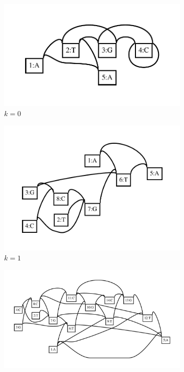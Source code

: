 \documentclass[a4paper,12pt,numbered,oneside]{Classes/PhDThesisPSnPDF}
\begin{document}
\begin{figure}[htbp!] 
  \centering
  \begin{subfigure}[t]{0.49\textwidth}
    \includegraphics[width=1.0\textwidth]{Chapter2/Figs/loopy_dagify0.pdf}
    \caption{$k=0$} \label{subfig:dagify_k0}
  \end{subfigure}
  \begin{subfigure}[t]{0.49\textwidth}
    \includegraphics[width=1.0\textwidth]{Chapter2/Figs/loopy_dagify1.pdf}
    \caption{$k=1$} \label{subfig:dagify_k1}
  \end{subfigure}
  \begin{subfigure}[t]{0.49\textwidth}
    \includegraphics[width=1.0\textwidth]{Chapter2/Figs/loopy_dagify4.pdf}

\end{subfigure}
\end{figure}
\end{document}

